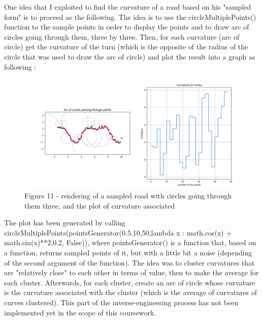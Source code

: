 \documentclass[a4paper,12pt,fleqn]{article}
\begin{document}
One idea that I exploited to find the curvature of a road based on his "sampled form" is to proceed as the following. The idea is to use the circleMultiplePoints() function to the sample points in order to display the points and to draw arc of circles going through them, three by three. Then, for each curvature (arc of circle) get the curvature of the turn (which is the opposite of the radius of the circle that was used to draw the arc of circle) and plot the result into a graph as following : 


\begin{figure}[H]
\centering
\includegraphics[width=\textwidth]{curvatures}
Figure 11 - rendering of a sampled road with circles going through them three, and the plot of curvature associated
\end{figure}

The plot has been generated by calling circleMultiplePoints(pointsGenerator(0.5,10,50,lambda x : math.cos(x) + math.sin(x)**2,0.2, False)), where pointsGenerator() is a function that, based on a function, returns sampled points of it, but with a little bit a noise (depending of the second argument of the function).
The idea was to cluster curvatures that are "relatively close" to each other in terms of value, then to make the average for each cluster. Afterwards, for each cluster, create an arc of circle whose curvature is the curvature associated with the cluster (which is the average of curvatures of curves clustered). This part of the inverse-engineering process has not been implemented yet in the scope of this coursework.








\end{document}
